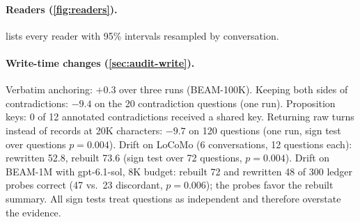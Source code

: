 \paragraph{Readers (\cref{fig:readers}).}  lists every reader with 95\% intervals resampled by
conversation.

\begin{table}[h]
\centering\small
\caption{\method{} minus Hindsight\,+\,CC and minus Hindsight on the development sets, per reader (tuned prompt,
gpt-6-luna judge, mean over the runs shown).}
\label{tab:readers-ci}
\setlength{\tabcolsep}{4pt}
\end{table}

\paragraph{Write-time changes (\cref{sec:audit-write}).} Verbatim anchoring: $+0.3$ over three runs (BEAM-100K). Keeping
both sides of contradictions: $-9.4$ on the 20 contradiction questions (one run). Proposition keys: 0 of 12 annotated
contradictions received a shared key. Returning raw turns instead of records at 20K characters: $-9.7$ on 120 questions
(one run, sign test over questions $p=0.004$). Drift on LoCoMo (6 conversations, 12 questions each): rewritten 52.8,
rebuilt 73.6 (sign test over 72 questions, $p=0.004$). Drift on BEAM-1M with gpt-6.1-sol, 8K budget: rebuilt 72 and
rewritten 48 of 300 ledger probes correct (47 vs.\ 23 discordant, $p=0.006$); the probes favor the rebuilt summary.
All sign tests treat questions as independent and therefore overstate the evidence.


